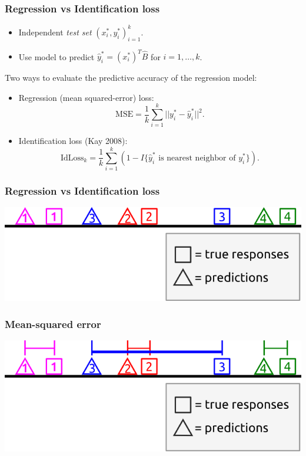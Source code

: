 \documentclass{beamer}
\begin{document}
\begin{frame}
\frametitle{Regression vs Identification loss}
\begin{itemize}
\item Independent \emph{test set} $(x_i^*, y_i^*)_{i=1}^k$. 
\item Use model to predict $\hat{y}_i^* = (x_i^*)^T \hat{B}$ for $i = 1,\hdots, k$.
\end{itemize}
Two ways to evaluate the predictive accuracy of the regression model:
\begin{itemize}
\item Regression (mean squared-error) loss:
\[
\text{MSE} = \frac{1}{k} \sum_{i=1}^k ||y_i^* - \hat{y}_i^*||^2.
\]
\item Identification loss (Kay 2008):
\[
\text{IdLoss}_k = \frac{1}{k} \sum_{i=1}^k (1 - I\{\hat{y}_i^* \text{ is nearest neighbor of }y_i^*\}).
\]
\end{itemize}
\end{frame}

\begin{frame}
\frametitle{Regression vs Identification loss}
\begin{center}
\includegraphics[scale = 0.5]{../diagram/idloss1.png}
\end{center}
\end{frame}

\begin{frame}
\frametitle{Mean-squared error}
\begin{center}
\includegraphics[scale = 0.5]{../diagram/idloss2a.png}
\end{center}
\end{frame}
\end{document}
